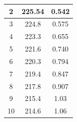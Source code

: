 \documentclass[a4paper,12pt]{article}
\begin{document}
\begin{table}[H]
\begin{subtable}[t]{0.45\textwidth}
\begin{tabular}{|c|c|c|}
			2                                                                               & 225.54                                                                                         & 0.542                                                                                      \\ \hline
			3                                                                              & 224.8                                                                                          & 0.575                                                                                      \\ \hline
			4                                                                               & 223.3                                                                                          & 0.655                                                                                      \\ \hline
			5                                                                               & 221.6                                                                                          & 0.740                                                                                      \\ \hline
			6                                                                               & 220.3                                                                                          & 0.794                                                                                      \\ \hline
			7                                                                               & 219.4                                                                                          & 0.847                                                                                      \\ \hline
			8                                                                               & 217.8                                                                                          & 0.907                                                                                      \\ \hline
			9                                                                               & 215.4                                                                                          & 1.03                                                                                       \\ \hline
			10                                                                               & 214.6                                                                                          & 1.06                                                                                       \\ \hline

\end{tabular}
\end{subtable}
\end{table}
\end{document}
